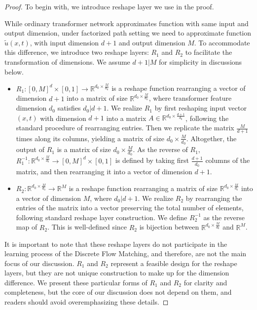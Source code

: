 \documentclass[12pt]{article}
\numberwithin{equation}{section}
\let\tilde\widetilde
\newcommand{\wt}{\widetilde}
\renewcommand{\tilde}{\wt}
\def\R{\mathbb{R}}
\theoremstyle{theoremstyle}
\numberwithin{equation}{section}
\numberwithin{theorem}{section}
\numberwithin{proposition}{section}
\numberwithin{definition}{section}
\numberwithin{lemma}{section}
\numberwithin{assumption}{section}
\numberwithin{remark}{section}
\begin{document}
\begin{proof}
To begin with, we introduce reshape layer we use in the proof.

While ordinary transformer network approximates function with same input and output dimension, under factorized path setting we need to approximate  function $\tilde{u}(x,t)$, with input dimension $d+1$ and output dimension $M$.
To accommodate this difference, we introduce two reshape layers: $R_1$ and $R_2$ to facilitate the transformation of dimensions.
We assume $d+1|M$ for simplicity in discussions below.
\begin{itemize}
\item $R_1:[0,M]^d\times[0,1]\to \R^{d_0\times \frac{M}{d_0}}$ is a reshape function rearranging a vector of dimension $d+1$ into a matrix of size $\R^{d_0\times \frac{M}{d_0}}$, where transformer feature dimension $d_0$ satisfies $d_0|d+1$.
We realize $R_1$ by first reshaping input vector $(x,t)$ with dimension $d+1$ into a matrix $A\in\R^{d_0\times \frac{d+1}{d_0}}$,  following the standard procedure of rearranging entries.
Then we replicate the matrix $\frac{M}{d+1}$ times along its columns, yielding a matrix of size $d_0\times \frac{M}{d_0}$.
Altogether, the output of $R_1$ is a matrix of size $d_0\times \frac{M}{d_0}$.
As the reverse of $R_1$, $R^{-1}_1:\R^{d_0\times \frac{M}{d_0}}\to[0,M]^d\times[0,1]$ is defined by taking first $\frac{d+1}{d_0}$ columns of the matrix, and then rearranging it into a vector of dimension $d+1$.

\item $R_2:\R^{d_0\times \frac{M}{d_0}}\to \R^{M}$ is a reshape function rearranging a matrix of size $\R^{d_0\times \frac{M}{d_0}}$ into a vector of dimension $M$, where $d_0|d+1$.
We realize $R_2$ by rearranging the entries of the matrix into a vector preserving the total number of elements, following standard reshape layer construction.
We define $R_2^{-1}$ as the reverse map of $R_2$.
This is well-defined since $R_2$ is bijection between $\R^{d_0\times \frac{M}{d_0}}$ and $\R^{M}$.

\end{itemize}

It is important to note that these reshape layers do not participate in the learning process of the Discrete Flow Matching, and therefore, are not the main focus of our discussion.
$R_1$ and $R_2$ represent a feasible design for the reshape layers, but they are not unique construction to make up for the dimension difference.
We present these particular forms of $R_1$ and $R_2$ for clarity and completeness, but the core of our discussion does not depend on them, and readers should avoid overemphasizing these details.


\end{proof}
\end{document}
